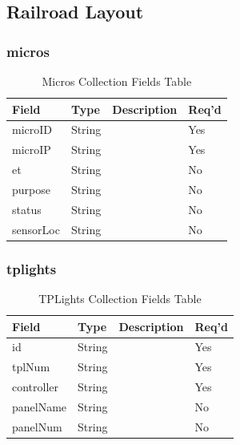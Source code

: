 \subsection{Railroad Layout}
\subsubsection{micros}
\begin{table}[H]
    \begin{tabular}{|L{3cm}|L{1.7cm}|L{8.8cm}|L{1.3cm}|}
    \hline
        \textbf{Field} & \textbf{Type} & \textbf{Description} & \textbf{Req'd} \\ \hline
	microID & String &  & Yes \\ \hline
	microIP & String &  & Yes \\ \hline
	et & String &  & No \\ \hline
	purpose & String &  & No \\ \hline
	status & String &  & No \\ \hline
	sensorLoc & String &  & No \\ \hline
    \end{tabular}
    \caption{\label{micro-table}Micros Collection Fields Table}
    \end{table}

\subsubsection{tplights}
\begin{table}[H]
    \begin{tabular}{|L{3cm}|L{1.7cm}|L{8.8cm}|L{1.3cm}|}
    \hline
        \textbf{Field} & \textbf{Type} & \textbf{Description} & \textbf{Req'd} \\ \hline
	id & String &  & Yes \\ \hline
	tplNum & String &  & Yes \\ \hline
	controller & String &  & Yes \\ \hline
	panelName & String &  & No \\ \hline
	panelNum & String &  & No \\ \hline
    \end{tabular}
    \caption{\label{tplight-table}TPLights Collection Fields Table}
    \end{table}

